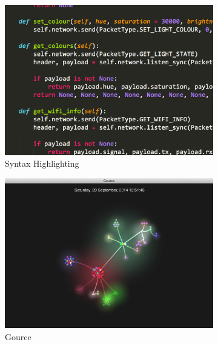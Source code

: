 \begin{figure}
\centering
\begin{subfigure}{.5\textwidth}
  \includegraphics[width=.95\linewidth]{../images/code-visualisations/syntax-highlighting.png}
  \caption{Syntax Highlighting}
  \label{fig:syntax-highlighting}
\end{subfigure}%
\begin{subfigure}{.5\textwidth}
  \includegraphics[width=.95\linewidth]{../images/code-visualisations/gource.png}
  \caption{Gource}
  \label{fig:gource}
\end{subfigure}\\
\begin{subfigure}{.5\textwidth}

\end{subfigure}
\end{figure}
